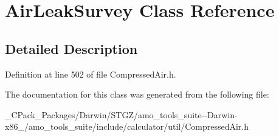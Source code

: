 \hypertarget{class_air_leak_survey}{}\section{Air\+Leak\+Survey Class Reference}
\label{class_air_leak_survey}


\subsection{Detailed Description}


Definition at line 502 of file Compressed\+Air.\+h.



The documentation for this class was generated from the following file\+:\begin{DoxyCompactItemize}
\item 
\+\_\+\+C\+Pack\+\_\+\+Packages/\+Darwin/\+S\+T\+G\+Z/amo\+\_\+tools\+\_\+suite-\/-\/\+Darwin-\/x86\+\_/amo\+\_\+tools\+\_\+suite/include/calculator/util/Compressed\+Air.\+h\end{DoxyCompactItemize}
